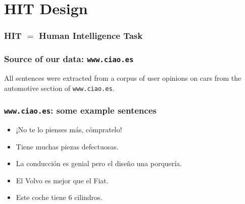 \documentclass[10pt]{beamer}
\newenvironment{itemwide}%
{\begin{itemize}%
    \setlength{\itemsep}{5pt}%
    \setlength{\parskip}{5pt}}%
  {\end{itemize}}
\begin{document}
\section{HIT Design}

\begin{frame}
  \frametitle{HIT $=$ Human Intelligence Task}
  \begin{center}
  \end{center}
\end{frame}

\begin{frame}
  \frametitle{Source of our data: \texttt{www.ciao.es}}

All sentences were extracted from a corpus of user opinions on cars from the automotive section of \texttt{www.ciao.es}.

  \begin{center}
  \end{center}

\end{frame}

\begin{frame}
  \frametitle{\texttt{www.ciao.es}: some example sentences}
\begin{itemwide}
 \item ¡No te lo pienses m\'{a}s, c\'ompratelo!
 \item Tiene muchas piezas defectuosas.
 \item La conducci\'{o}n es genial pero el diseño una porquer\'{i}a.
 \item El Volvo es mejor que el Fiat.
 \item Este coche tiene 6 cilindros.
\end{itemwide}


\end{frame}
\end{document}
